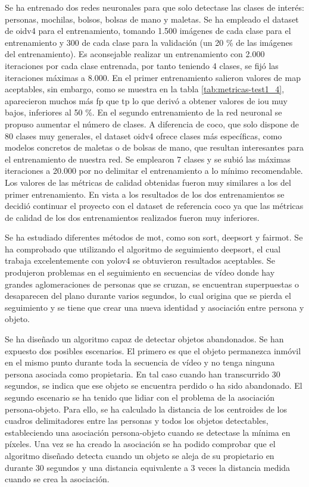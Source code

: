 Se ha entrenado dos redes neuronales para que solo detectase las clases de interés: personas, mochilas, bolsos, bolsas de mano y maletas. Se ha empleado el dataset de \gls{oidv4} para el entrenamiento, tomando 1.500 imágenes de cada clase para el entrenamiento y 300 de cada clase para la validación (un 20 \% de las imágenes del entrenamiento). Es aconsejable realizar un entrenamiento con 2.000 iteraciones por cada clase entrenada, por tanto teniendo 4 clases, se fijó las iteraciones máximas a 8.000. En el primer entrenamiento salieron valores de \gls{map} aceptables, sin embargo, como se muestra en la tabla \ref{tab:metricas-test1_4}, aparecieron muchos más \gls{fp} que \gls{tp} lo que derivó a obtener valores de \gls{iou} muy bajos, inferiores al 50 \%. En el segundo entrenamiento de la red neuronal se propuso aumentar el número de clases. A diferencia de \gls{coco}, que solo dispone de 80 clases muy generales, el dataset \gls{oidv4} ofrece clases más específicas, como modelos concretos de maletas o de bolsas de mano, que resultan interesantes para el entrenamiento de nuestra red. Se emplearon 7 clases y se subió las máximas iteraciones a 20.000 por no delimitar el entrenamiento a lo mínimo recomendable. Los valores de las métricas de calidad obtenidas fueron muy similares a los del primer entrenamiento. En vista a los resultados de los dos entrenamientos se decidió continuar el proyecto con el dataset de referencia \gls{coco} ya que las métricas de calidad de los dos entrenamientos realizados fueron muy inferiores.

Se ha estudiado diferentes métodos de \gls{mot}, como son \gls{sort}, \gls{deepsort} y \gls{fairmot}. Se ha comprobado que utilizando el algoritmo de seguimiento \gls{deepsort}, el cual trabaja excelentemente con \gls{yolov4} se obtuvieron resultados aceptables. Se produjeron problemas en el seguimiento en secuencias de vídeo donde hay grandes aglomeraciones de personas que se cruzan, se encuentran superpuestas o desaparecen del plano durante varios segundos, lo cual origina que se pierda el seguimiento y se tiene que crear una nueva identidad y asociación entre persona y objeto.

Se ha diseñado un algoritmo capaz de detectar objetos abandonados. Se han expuesto dos posibles escenarios. El primero es que el objeto permanezca inmóvil en el mismo punto durante toda la secuencia de vídeo y no tenga ninguna persona asociada como propietaria. En tal caso cuando han transcurrido 30 segundos, se indica que ese objeto se encuentra perdido o ha sido abandonado. El segundo escenario se ha tenido que lidiar con el problema de la asociación persona-objeto. Para ello, se ha calculado la distancia de los centroides de los cuadros delimitadores entre las personas y todos los objetos detectables, estableciendo una asociación persona-objeto cuando se detectase la mínima en píxeles. Una vez se ha creado la asociación se ha podido comprobar que el algoritmo diseñado detecta cuando un objeto se aleja de su propietario en durante 30 segundos y una distancia equivalente a 3 veces la distancia medida cuando se crea la asociación.

